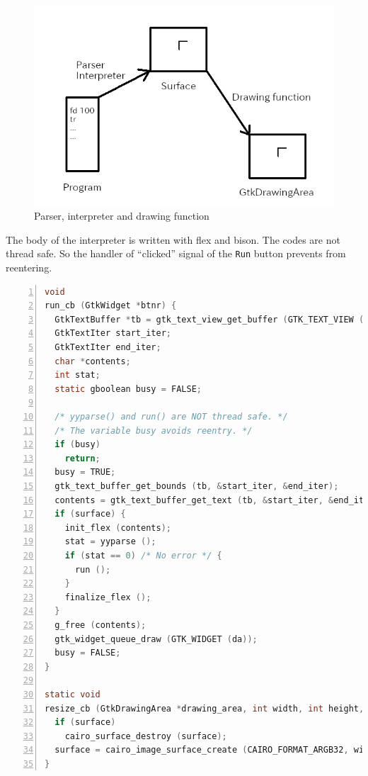 \begin{figure}
\centering
\includegraphics{../image/turtle.png}
\caption{Parser, interpreter and drawing function}
\end{figure}

The body of the interpreter is written with flex and bison. The codes
are not thread safe. So the handler of ``clicked'' signal of the
\passthrough{\lstinline!Run!} button prevents from reentering.

\begin{lstlisting}[language=C, numbers=left]
void
run_cb (GtkWidget *btnr) {
  GtkTextBuffer *tb = gtk_text_view_get_buffer (GTK_TEXT_VIEW (tv));
  GtkTextIter start_iter;
  GtkTextIter end_iter;
  char *contents;
  int stat;
  static gboolean busy = FALSE;

  /* yyparse() and run() are NOT thread safe. */
  /* The variable busy avoids reentry. */
  if (busy)
    return;
  busy = TRUE;
  gtk_text_buffer_get_bounds (tb, &start_iter, &end_iter);
  contents = gtk_text_buffer_get_text (tb, &start_iter, &end_iter, FALSE);
  if (surface) {
    init_flex (contents);
    stat = yyparse ();
    if (stat == 0) /* No error */ {
      run ();
    }
    finalize_flex ();
  }
  g_free (contents);
  gtk_widget_queue_draw (GTK_WIDGET (da));
  busy = FALSE;
}

static void
resize_cb (GtkDrawingArea *drawing_area, int width, int height, gpointer user_data) {
  if (surface)
    cairo_surface_destroy (surface);
  surface = cairo_image_surface_create (CAIRO_FORMAT_ARGB32, width, height);
}
\end{lstlisting}

